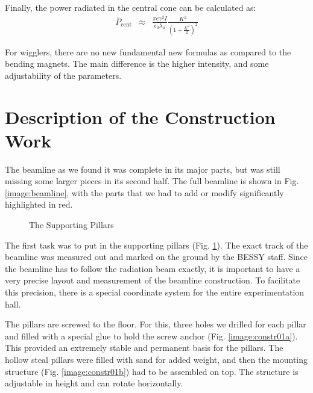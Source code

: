 \documentclass[a4paper,10pt]{article}
\begin{document}
    Finally, the power radiated in the central cone can be calculated as:
\begin{eqnarray}
  \bar{P}_{\text{cent}} &\approx& \frac{\pi e \gamma^2 I}{\epsilon_0 \lambda_u}
                                  \frac{K^2}{(1 + \frac{K^2}{2})^2}
\end{eqnarray}

    For wigglers, there are no new fundamental new formulas as compared to
the bending magnets. The main difference is the higher intensity, and some
adjustability of the parameters.


\section{Description of the Construction Work} 
\label{Description of the Construction Work}

The beamline as we found it was complete in its major parts, but was still
missing some larger pieces in its second half. The full beamline is shown in
Fig. \ref{image:beamline}, with the parts that we had to add or modify
significantly highlighted in red.

\begin{figure}[htp]
  \begin{center}
  \end{center}
  \caption{The Supporting Pillars}
  \label{image:constr01}
\end{figure}

    The first task was to put in the supporting pillars (Fig.
\ref{image:constr01}). The exact track of the beamline was measured out and
marked on the ground by the BESSY staff. Since the beamline has to follow the
radiation beam exactly, it is important to have a very precise layout and
measurement of the beamline construction. To facilitate this precision, there is
a special coordinate system for the entire experimentation hall.

    The pillars are screwed to the floor. For this, three holes we drilled
for each pillar and filled with a special glue to hold the screw anchor (Fig.
\ref{image:constr01a}). This provided an extremely stable and permanent basis
for the pillars. The hollow steal pillars were filled with sand for added
weight, and then the mounting structure (Fig. \ref{image:constr01b})  had to be
assembled on top. The structure is adjustable in height and can rotate
horizontally.
\end{document}
